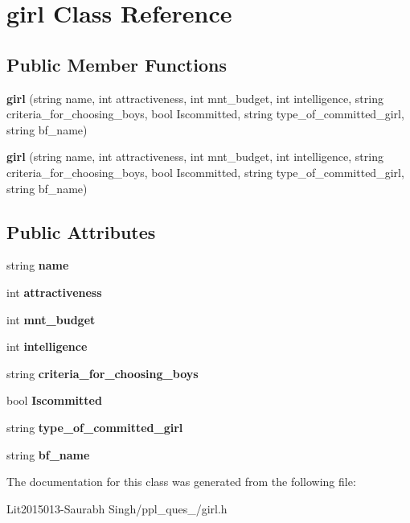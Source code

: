\hypertarget{classgirl}{}\section{girl Class Reference}
\label{classgirl}
\subsection*{Public Member Functions}
\begin{DoxyCompactItemize}
\item 
\mbox{\label{classgirl_a515ef3f56aaa368ff430235e10b805c4}} 
{\bfseries girl} (string name, int attractiveness, int mnt\+\_\+budget, int intelligence, string criteria\+\_\+for\+\_\+choosing\+\_\+boys, bool Iscommitted, string type\+\_\+of\+\_\+committed\+\_\+girl, string bf\+\_\+name)
\item 
\mbox{\label{classgirl_a515ef3f56aaa368ff430235e10b805c4}} 
{\bfseries girl} (string name, int attractiveness, int mnt\+\_\+budget, int intelligence, string criteria\+\_\+for\+\_\+choosing\+\_\+boys, bool Iscommitted, string type\+\_\+of\+\_\+committed\+\_\+girl, string bf\+\_\+name)
\end{DoxyCompactItemize}
\subsection*{Public Attributes}
\begin{DoxyCompactItemize}
\item 
\mbox{\label{classgirl_a29a828b5fa3408535974cde15ccdd75b}} 
string {\bfseries name}
\item 
\mbox{\label{classgirl_a0ba667f73d41f7bc3236141daaec9246}} 
int {\bfseries attractiveness}
\item 
\mbox{\label{classgirl_ab37511df32db77f4c7307311daa32b24}} 
int {\bfseries mnt\+\_\+budget}
\item 
\mbox{\label{classgirl_a6c7e5b42204c88fae8b91aae92ae17f1}} 
int {\bfseries intelligence}
\item 
\mbox{\label{classgirl_a9ba2affef7bf8c54fc3ca7c0e16a1f1b}} 
string {\bfseries criteria\+\_\+for\+\_\+choosing\+\_\+boys}
\item 
\mbox{\label{classgirl_a2e6c34b60f514827eb9809e015888ee3}} 
bool {\bfseries Iscommitted}
\item 
\mbox{\label{classgirl_ae45fc5adc5b383a61a4f5728ac434174}} 
string {\bfseries type\+\_\+of\+\_\+committed\+\_\+girl}
\item 
\mbox{\label{classgirl_a2de471a846b3cb724daef9b70e6614f7}} 
string {\bfseries bf\+\_\+name}
\end{DoxyCompactItemize}


The documentation for this class was generated from the following file\+:\begin{DoxyCompactItemize}
\item 
Lit2015013-\/\+Saurabh Singh/ppl\+\_\+ques\+\_/girl.\+h\end{DoxyCompactItemize}
